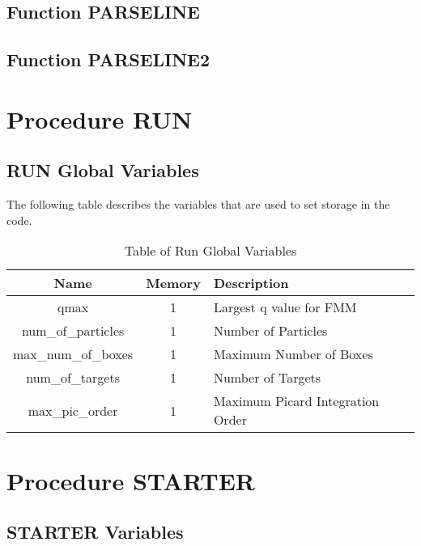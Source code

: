 \documentclass[oneside,12pt]{book}
\begin{document}
\subsection{Function PARSELINE}

\subsection{Function PARSELINE2}

\section{Procedure RUN}

\subsection{RUN Global Variables}

The following table describes the variables that are used to set storage in the code.

\bigskip
\begin{center}
\begin{table}[ht]
\begin{tabular}{|c|c|p{3.5in}|}
\hline
\textbf{Name} & \textbf{Memory} & \textbf{Description}\\
\hline
qmax & 1 & Largest q value for FMM\\
\hline
num{\_}of{\_}particles & 1 & Number of Particles\\
\hline
max{\_}num{\_}of{\_}boxes & 1 & Maximum Number of Boxes\\
\hline
num{\_}of{\_}targets & 1 & Number of Targets\\
\hline
max{\_}pic{\_}order & 1 & Maximum Picard Integration Order\\
\hline
\end{tabular}
\caption{Table of Run Global Variables}
\end{table}
\end{center}

\clearpage

\section{Procedure STARTER}

\subsection{STARTER Variables}
\end{document}
